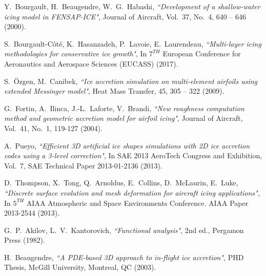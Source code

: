 \documentclass[
11pt,%
tightenlines,%
twoside,%
onecolumn,%
nofloats,%
nobibnotes,%
nofootinbib,%
superscriptaddress,%
noshowpacs,%
centertags]%
{revtex4}
\begin{document}
\begin{thebibliography}{99}

Y.~Bourgault, H.~Beaugendre, W.~G.~Habashi, {\it ``Development of a shallow-water icing model in FENSAP-ICE"}, Journal of Aircraft, Vol.~37, No.~4, 640 -- 646 (2000).

S.~Bourgault-C\^ot\'e, K.~Hasanzadeh, P.~Lavoie, E.~Laurendeau, {\it ``Multi-layer icing methodologies for conservative ice growth"}, In $7^{TH}$ European Conference for Aeronautics and Aerospace Sciences (EUCASS) (2017).

S.~\"Ozgen, M.~Canibek, {\it ``Ice accretion simulation on multi-element airfoils using extended Messinger model"}, Heat Mass Transfer, 45, 305 -- 322 (2009).

G.~Fortin, A.~Ilinca, J.-L.~Laforte, V.~Brandi, {\it ``New roughness computation method and geometric accretion model for airfoil icing"}, Journal of Aircraft, Vol.~41, No.~1, 119-127 (2004).

A.~Pueyo, {\it ``Efficient 3D artificial ice shapes simulations with 2D ice accretion codes using a 3-level correction"}, In SAE 2013 AeroTech Congress and Exhibition, Vol.~7, SAE Technical Paper 2013-01-2136 (2013).

D.~Thompson, X.~Tong, Q.~Arnoldus, E.~Collins, D.~McLaurin, E.~Luke, {\it ``Discrete surface evolution and mesh deformation for aircraft icing applications"}, In $5^{TH}$ AIAA Atmospheric and Space Environments Conference. AIAA Paper 2013-2544 (2013).

G.~P.~Akilov, L.~V.~Kantorovich, {\it ``Functional analysis"}, 2nd ed., Pergamon Press (1982). 

H.~Beaugendre, {\it ``A PDE-based 3D approach to in-flight ice accretion"}, PHD Thesis, McGill University, Montreal, QC (2003).

\end{thebibliography}
\end{document}
